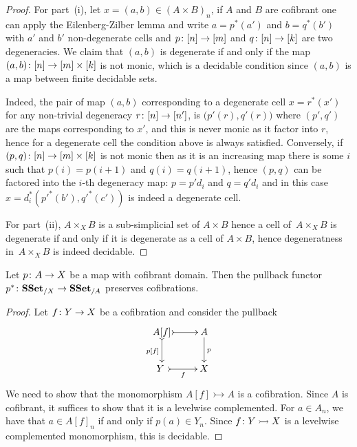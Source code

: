 \documentclass[reqno,10pt,a4paper,oneside,draft]{amsart}
\begin{document}
\begin{proof} For part~(i), let $x = (a,b) \in (A \times B)_n$, if $A$ and $B$ are cofibrant one can apply the Eilenberg-Zilber lemma and write $a = p^*(a')$ and $b = q^*(b')$ with $a'$ and $b'$ non-degenerate cells and $p \colon [n] \to [m]$ and $q \colon [n] \to [k]$ are two degeneracies. We claim that $(a,b)$ is degenerate if and only if the map $(a ,b )  \colon [n] \rightarrow [m] \times [k]$ is not monic, which is a decidable condition since $(a,b)$ is a map between finite decidable sets.

Indeed, the pair of map $(a,b)$ corresponding to a degenerate cell $x=r^*(x')$ for any non-trivial degeneracy $r \colon [n] \to [n']$, is  $\big( p'(r),q'(r) \big)$ where $(p',q')$ are the maps corresponding to $x'$, and this is never monic as it factor into $r$, hence for a degenerate cell the condition above is always satisfied. Conversely, if $(p,q)\colon [n] \rightarrow [m] \times [k]$ is not monic then as it is an increasing map there is some $i$ such that $p(i)=p(i+1)$ and $q(i)=q(i+1)$, hence $(p,q)$ can be factored into the $i$-th degeneracy map: $p=p' d_i$ and $q=q' d_i$ and in this case $x= d_i^* (p'^*(b'),q'^*(c'))$ is indeed a degenerate cell.


For part~(ii), $A \times_X B$ is a sub-simplicial set of $A \times B$ hence a cell of~$A \times_X B$ is degenerate if and only if it is degenerate as a cell of $A \times B$, hence degeneratness 
in~$A \times_X B$ is indeed decidable. 
\end{proof}





\begin{proposition} \label{thm:cof-pbk}  Let $p \colon A \to X$  be a map with cofibrant domain.
Then the pullback functor $p^* \colon \mathbf{SSet}_{/X} \to \mathbf{SSet}_{/A}$ preserves cofibrations. 
\end{proposition}

\begin{proof} Let $f \colon Y \to X$ be a cofibration and consider the pullback
\[
\xymatrix{
A[f]  \ar@{>->}[r] \ar@{>->}[d]_-{p[f]} &  A \ar[d]^{p} \\
Y \ar@{>->}[r]_{f} \ & X}
\]
We need to show that the monomorphism $A[f] \rightarrowtail A$ is a cofibration. 
Since $A$ is cofibrant, it suffices to show that it is a levelwise complemented. For $a \in A_n$, we have that $a \in A[f]_n$ if and only if $p(a) \in Y_n$. Since $f \colon Y \rightarrowtail X$ is a levelwise complemented monomorphism, this is decidable.
\end{proof} 
\end{document}
